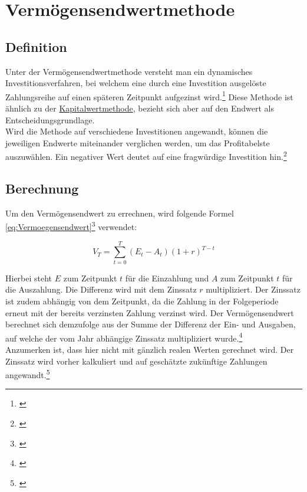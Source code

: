 \chapter{Vermögensendwertmethode}
\label{Vermoegensendwertmethode}

\section{Definition}

Unter der Vermögensendwertmethode versteht man ein dynamisches Investitionsverfahren, bei welchem eine durch eine Investition ausgelöste Zahlungsreihe auf einen späteren Zeitpunkt aufgezinst wird.\footnote{\cite{finanzen-vermoegensendwertmethode}} Diese Methode ist ähnlich zu der \hyperref[Kapitalwertmethode]{Kapitalwertmethode}, bezieht sich aber auf den Endwert als Entscheidungsgrundlage.\\
Wird die Methode auf verschiedene Investitionen angewandt, können die jeweiligen Endwerte miteinander verglichen werden, um das Profitabelste auszuwählen. Ein negativer Wert deutet auf eine fragwürdige Investition hin.\footnote{\cite{bwllernen-endwertmethode}}

\section{Berechnung}

Um den Vermögensendwert zu errechnen, wird folgende Formel \eqref{eq:Vermoegensendwert}\footnote{\cite{studyflix-endwertmethode}} verwendet:

\begin{equation}
    V_T = \sum_{ t = 0 }^{ T }{(E_{ t } - A_{ t })(1 + r)^{T - t}}
    \label{eq:Vermoegensendwert}
\end{equation}

\bigskip

\noindent
Hierbei steht $E$ zum Zeitpunkt $t$ für die Einzahlung und $A$ zum Zeitpunkt $t$ für die Auszahlung. Die Differenz wird mit dem Zinssatz $r$ multipliziert. Der Zinssatz ist zudem abhängig von dem Zeitpunkt, da die Zahlung in der Folgeperiode erneut mit der bereits verzinsten Zahlung verzinst wird. Der Vermögensendwert berechnet sich demzufolge aus der Summe der Differenz der Ein- und Ausgaben, auf welche der vom Jahr abhängige Zinssatz multipliziert wurde.\footnote{\cite{studyflix-endwertmethode}}\\

\noindent
Anzumerken ist, dass hier nicht mit gänzlich realen Werten gerechnet wird. Der Zinssatz wird vorher kalkuliert und auf geschätzte zukünftige Zahlungen angewandt.\footnote{\cite{finanzen-vermoegensendwertmethode}}

